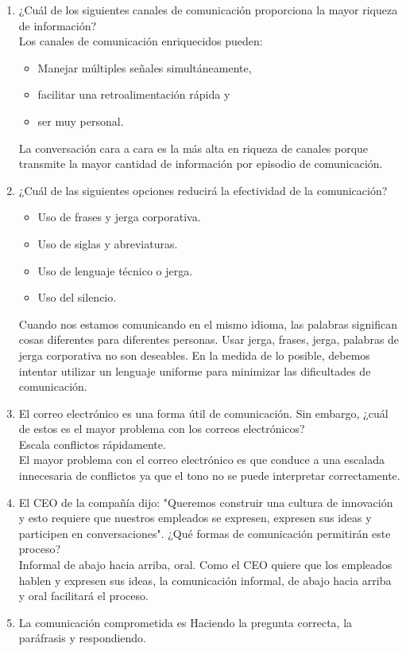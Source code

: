 \documentclass[10pt]{book}
\begin{document}
\begin{enumerate}[\bfseries 1.]
\item ¿Cuál de los siguientes canales de comunicación proporciona la mayor riqueza de información?\\
Los canales de comunicación enriquecidos pueden:
\begin{itemize}
\item Manejar múltiples señales simultáneamente, 
\item facilitar una retroalimentación rápida y 
\item ser muy personal. 
\end{itemize}
La conversación cara a cara es la más alta en riqueza de canales porque transmite la mayor cantidad de información por episodio de comunicación.
\item ¿Cuál de las siguientes opciones reducirá la efectividad de la comunicación?\\
\begin{itemize}
\item Uso de frases y jerga corporativa.
\item Uso de siglas y abreviaturas.
\item Uso de lenguaje técnico o jerga.
\item Uso del silencio.
\end{itemize}
Cuando nos estamos comunicando en el mismo idioma, las palabras significan cosas diferentes para diferentes personas. Usar jerga, frases, jerga, palabras de jerga corporativa no son deseables. En la medida de lo posible, debemos intentar utilizar un lenguaje uniforme para minimizar las dificultades de comunicación.
\item El correo electrónico es una forma útil de comunicación. Sin embargo, ¿cuál de estos es el mayor problema con los correos electrónicos?\\
Escala conflictos rápidamente.\\
El mayor problema con el correo electrónico es que conduce a una escalada innecesaria de conflictos ya que el tono no se puede interpretar correctamente.
\item El CEO de la compañía dijo: "Queremos construir una cultura de innovación y esto requiere que nuestros empleados se expresen, expresen sus ideas y participen en conversaciones". ¿Qué formas de comunicación permitirán este proceso?\\
Informal de abajo hacia arriba, oral. Como el CEO quiere que los empleados hablen y expresen sus ideas, la comunicación informal, de abajo hacia arriba y oral facilitará el proceso.
\item La comunicación comprometida es Haciendo la pregunta correcta, la paráfrasis y respondiendo.

\end{enumerate}
\end{document}
